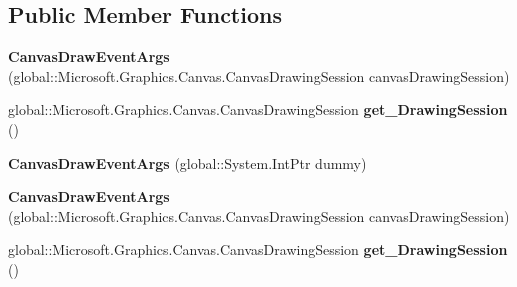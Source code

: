 \subsection*{Public Member Functions}
\begin{DoxyCompactItemize}
\item 
\mbox{\label{class_microsoft_1_1_graphics_1_1_canvas_1_1_u_i_1_1_xaml_1_1_canvas_draw_event_args_a7c611838656ec15a66449dc1811b44b3}} 
{\bfseries Canvas\+Draw\+Event\+Args} (global\+::\+Microsoft.\+Graphics.\+Canvas.\+Canvas\+Drawing\+Session canvas\+Drawing\+Session)
\item 
\mbox{\label{class_microsoft_1_1_graphics_1_1_canvas_1_1_u_i_1_1_xaml_1_1_canvas_draw_event_args_ac6b164ff9cb3ed289d7a835f2548e553}} 
global\+::\+Microsoft.\+Graphics.\+Canvas.\+Canvas\+Drawing\+Session {\bfseries get\+\_\+\+Drawing\+Session} ()
\item 
\mbox{\label{class_microsoft_1_1_graphics_1_1_canvas_1_1_u_i_1_1_xaml_1_1_canvas_draw_event_args_a9e2162ca5b12321e5fdc3e89153e2ea4}} 
{\bfseries Canvas\+Draw\+Event\+Args} (global\+::\+System.\+Int\+Ptr dummy)
\item 
\mbox{\label{class_microsoft_1_1_graphics_1_1_canvas_1_1_u_i_1_1_xaml_1_1_canvas_draw_event_args_a7c611838656ec15a66449dc1811b44b3}} 
{\bfseries Canvas\+Draw\+Event\+Args} (global\+::\+Microsoft.\+Graphics.\+Canvas.\+Canvas\+Drawing\+Session canvas\+Drawing\+Session)
\item 
\mbox{\label{class_microsoft_1_1_graphics_1_1_canvas_1_1_u_i_1_1_xaml_1_1_canvas_draw_event_args_ac6b164ff9cb3ed289d7a835f2548e553}} 
global\+::\+Microsoft.\+Graphics.\+Canvas.\+Canvas\+Drawing\+Session {\bfseries get\+\_\+\+Drawing\+Session} ()
\item 
\mbox{\label{class_microsoft_1_1_graphics_1_1_canvas_1_1_u_i_1_1_xaml_1_1_canvas_draw_event_args_a9e2162ca5b12321e5fdc3e89153e2ea4}} 

\end{DoxyCompactItemize}
